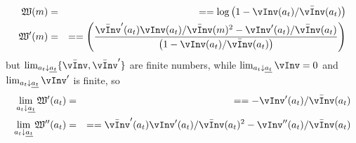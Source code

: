 \newcommand{\vPF}{\bar{\vInv}}
\newcommand{\cPF}{\bar{\cFunc}}
\newcommand{\W}{\mathfrak{W}}
\newcommand{\at}{a_{t}}
\newcommand{\atDown}{\lim_{\at \downarrow \underline{\at}}}
  \begin{equation}\begin{gathered}\begin{aligned}
    \W(m)   & = &  =  = \log \left(1-\vInv(\at)/\vPF(\at)\right)
\\ \W^{\prime}(m)   & = &  =  = \left(\frac{\vPF^{\prime}(\at)\vInv(\at)/\vPF(m)^2-\vInv^{\prime}(\at)/\vPF(\at)}{\left(1-\vInv(\at)/\vPF(\at)\right) }\right)
  \end{aligned}\end{gathered}\end{equation}
but $\atDown \{\vPF,\vPF^{\prime}\}$ are finite numbers, while $\atDown \vInv = 0$ and $\atDown \vInv^{\prime}$ is finite, so
  \begin{equation}\begin{gathered}\begin{aligned}
   \atDown \W^{\prime}(\at)   & = &  =  = -\vInv^{\prime}(\at)/\vPF(\at)
\\ \atDown \W^{\prime\prime}(\at)   & = &  =  = \vPF^{\prime}(\at)\vInv^{\prime}(\at)/\vPF(\at)^{2}-\vInv^{\prime\prime}(\at)/\vPF(\at  )
  \end{aligned}\end{gathered}\end{equation}


